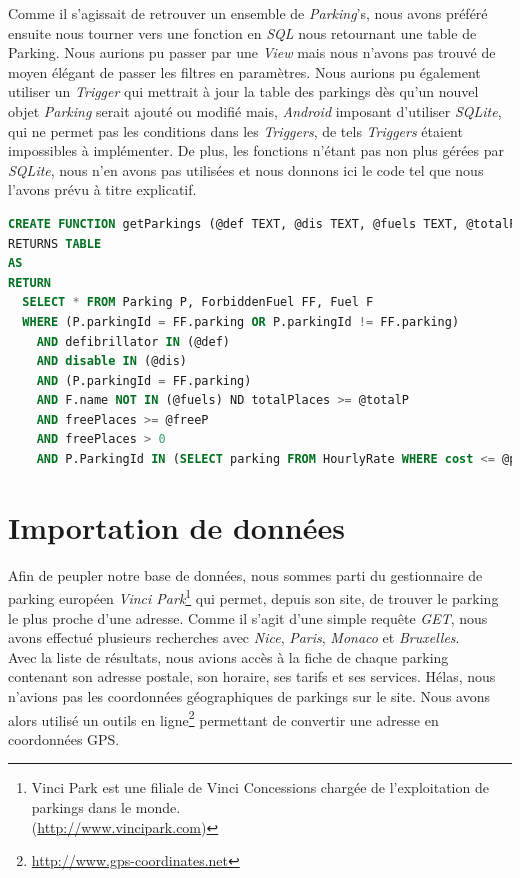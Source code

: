 \documentclass[a4paper,11pt]{article}
\begin{document}
Comme il s'agissait de retrouver un ensemble de \textit{Parking}'s, nous avons préféré ensuite nous tourner vers une fonction en \emph{SQL} nous retournant une table de Parking.  Nous aurions pu passer par une \emph{View} mais nous n'avons pas trouvé de moyen élégant de passer les filtres en paramètres.  Nous aurions pu également utiliser un \emph{Trigger} qui mettrait à jour la table des parkings dès qu'un nouvel objet \textit{Parking} serait ajouté ou modifié mais, \emph{Android} imposant d'utiliser \emph{SQLite}, qui ne permet pas les conditions dans les \emph{Triggers}, de tels \emph{Triggers} étaient impossibles à implémenter.  De plus, les fonctions n'étant pas non plus gérées par \emph{SQLite}, nous n'en avons pas utilisées et nous donnons ici le code tel que nous l'avons prévu à titre explicatif.
\begin{lstlisting}[language=SQL]
CREATE FUNCTION getParkings (@def TEXT, @dis TEXT, @fuels TEXT, @totalP INT, @freeP INT, @price INT)
RETURNS TABLE
AS
RETURN
  SELECT * FROM Parking P, ForbiddenFuel FF, Fuel F
  WHERE (P.parkingId = FF.parking OR P.parkingId != FF.parking)
    AND defibrillator IN (@def) 
    AND disable IN (@dis)
    AND (P.parkingId = FF.parking)
    AND F.name NOT IN (@fuels) ND totalPlaces >= @totalP 
    AND freePlaces >= @freeP
    AND freePlaces > 0
    AND P.ParkingId IN (SELECT parking FROM HourlyRate WHERE cost <= @price)
\end{lstlisting}


\section{Importation de données}
Afin de peupler notre base de données, nous sommes parti du gestionnaire de parking européen \emph{Vinci Park}\footnote{Vinci Park est une filiale de Vinci Concessions chargée de l'exploitation de parkings dans le monde.\\(\url{http://www.vincipark.com})} qui permet, depuis son site, de trouver le parking le plus proche d'une adresse.  Comme il s'agit d'une simple requête \emph{GET}, nous avons effectué plusieurs recherches avec \emph{Nice}, \emph{Paris}, \emph{Monaco} et \emph{Bruxelles}.\\

Avec la liste de résultats, nous avions accès à la fiche de chaque parking contenant son adresse postale, son horaire, ses tarifs et ses services.  Hélas, nous n'avions pas les coordonnées géographiques de parkings sur le site.  Nous avons alors utilisé un outils en ligne\footnote{\url{http://www.gps-coordinates.net}} permettant de convertir une adresse en coordonnées GPS.\\
\end{document}
